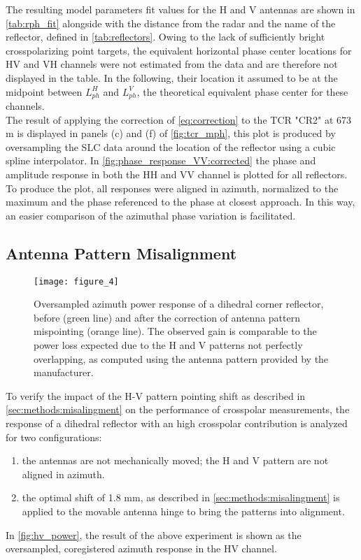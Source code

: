 The resulting model parameters fit values for the H and V antennas are shown in \autoref{tab:rph_fit} alongside with the distance from the radar and the name of the reflector, defined in \autoref{tab:reflectors}. Owing to the lack of sufficiently bright crosspolarizing point targets, the equivalent horizontal phase center locations for HV and VH channels were not estimated from the data and are therefore not displayed in the table. In the following, their location it assumed to be at the midpoint between $L_{ph}^{H}$ and $L_{ph}^{V}$, the theoretical equivalent phase center for these channels.\\
The result of applying the correction of \eqref{eq:correction} to the TCR "CR2" at 673 m is displayed in panels (c) and (f) of \autoref{fig:tcr_mph}, this plot is produced by oversampling the SLC data around the location of the reflector using a cubic spline interpolator.
In \autoref{fig:phase_response_VV:corrected} the phase and amplitude response in both the HH and VV channel is plotted for all reflectors. To produce the plot, all responses were aligned in azimuth, normalized to the maximum and the phase referenced to the phase at closest approach. In this way, an easier comparison of the azimuthal phase variation is facilitated.
\subsection{Antenna Pattern Misalignment}\label{sec:results:misalignment}
\begin{figure}[Ht!]
	\centering
	\texttt{[image: figure\_4]}
	\caption{Oversampled azimuth power response of a dihedral corner reflector, before (green line) and after the correction of antenna pattern mispointing (orange line). The observed gain is comparable to the power loss expected due to the H and V patterns not perfectly overlapping, as computed using the antenna pattern provided by the manufacturer.}
	\label{fig:hv_power}
\end{figure}
To verify the impact of the H-V pattern pointing shift as described in \autoref{sec:methods:misalingment} on the performance of crosspolar measurements, the response of a dihedral reflector with an high crosspolar contribution is analyzed for two configurations:\\ 
\begin{enumerate}
	\item the antennas are not mechanically moved; the H and V pattern are not aligned in azimuth.
	\item the optimal shift of 1.8 mm, as described in \autoref{sec:methods:misalingment} is applied to the movable antenna hinge to bring the patterns into alignment.\\ 
\end{enumerate}
In \autoref{fig:hv_power}, the result of the above experiment is shown as the oversampled, coregistered azimuth response in the HV channel.
